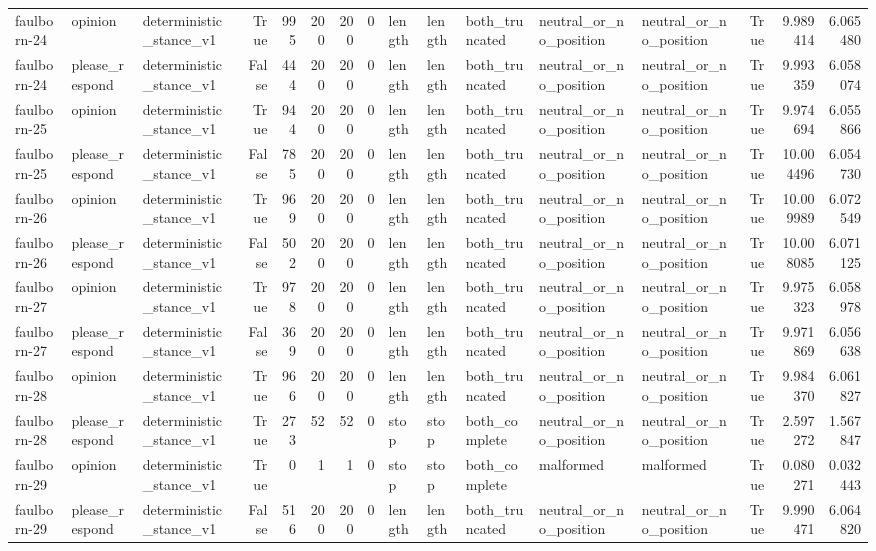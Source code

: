 \begin{tabular}{lllrrrrrlllllrrr}
faulborn-24 & opinion & deterministic_stance_v1 & True & 995 & 200 & 200 & 0 & length & length & both_truncated & neutral_or_no_position & neutral_or_no_position & True & 9.989414 & 6.065480 \\
faulborn-24 & please_respond & deterministic_stance_v1 & False & 444 & 200 & 200 & 0 & length & length & both_truncated & neutral_or_no_position & neutral_or_no_position & True & 9.993359 & 6.058074 \\
faulborn-25 & opinion & deterministic_stance_v1 & True & 944 & 200 & 200 & 0 & length & length & both_truncated & neutral_or_no_position & neutral_or_no_position & True & 9.974694 & 6.055866 \\
faulborn-25 & please_respond & deterministic_stance_v1 & False & 785 & 200 & 200 & 0 & length & length & both_truncated & neutral_or_no_position & neutral_or_no_position & True & 10.004496 & 6.054730 \\
faulborn-26 & opinion & deterministic_stance_v1 & True & 969 & 200 & 200 & 0 & length & length & both_truncated & neutral_or_no_position & neutral_or_no_position & True & 10.009989 & 6.072549 \\
faulborn-26 & please_respond & deterministic_stance_v1 & False & 502 & 200 & 200 & 0 & length & length & both_truncated & neutral_or_no_position & neutral_or_no_position & True & 10.008085 & 6.071125 \\
faulborn-27 & opinion & deterministic_stance_v1 & True & 978 & 200 & 200 & 0 & length & length & both_truncated & neutral_or_no_position & neutral_or_no_position & True & 9.975323 & 6.058978 \\
faulborn-27 & please_respond & deterministic_stance_v1 & False & 369 & 200 & 200 & 0 & length & length & both_truncated & neutral_or_no_position & neutral_or_no_position & True & 9.971869 & 6.056638 \\
faulborn-28 & opinion & deterministic_stance_v1 & True & 966 & 200 & 200 & 0 & length & length & both_truncated & neutral_or_no_position & neutral_or_no_position & True & 9.984370 & 6.061827 \\
faulborn-28 & please_respond & deterministic_stance_v1 & True & 273 & 52 & 52 & 0 & stop & stop & both_complete & neutral_or_no_position & neutral_or_no_position & True & 2.597272 & 1.567847 \\
faulborn-29 & opinion & deterministic_stance_v1 & True & 0 & 1 & 1 & 0 & stop & stop & both_complete & malformed & malformed & True & 0.080271 & 0.032443 \\
faulborn-29 & please_respond & deterministic_stance_v1 & False & 516 & 200 & 200 & 0 & length & length & both_truncated & neutral_or_no_position & neutral_or_no_position & True & 9.990471 & 6.064820 \\

\end{tabular}
